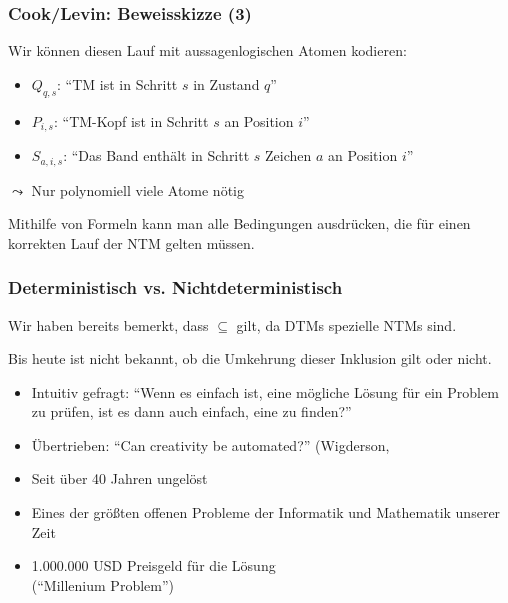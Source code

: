\documentclass[aspectratio=1610,onlymath]{beamer}
\begin{document}
\begin{frame}\frametitle{Cook/Levin: Beweisskizze (3)}

Wir können diesen Lauf mit aussagenlogischen Atomen kodieren:
\begin{itemize}
\item $Q_{q,s}$: "`TM ist in Schritt $s$ in Zustand $q$"'
% 
\item $P_{i,s}$: "`TM-Kopf ist in Schritt $s$ an Position $i$"'
\item $S_{a,i,s}$: "`Das Band enthält in Schritt $s$ Zeichen $a$ an Position $i$"'
\end{itemize}
$\leadsto$ Nur polynomiell viele Atome nötig
\bigskip

Mithilfe von Formeln kann man alle Bedingungen ausdrücken, die für einen korrekten Lauf der NTM gelten müssen.

\medskip



\end{frame}

\begin{frame}\frametitle{Deterministisch vs. Nichtdeterministisch}

	Wir haben bereits bemerkt, dass  ${}\subseteq{}$  gilt, da DTMs spezielle NTMs sind.
	\medskip

  \alert{Bis heute ist nicht bekannt, ob die Umkehrung dieser Inklusion gilt oder nicht.}
  \begin{itemize}
  \item Intuitiv gefragt: "`Wenn es einfach ist, eine mögliche Lösung für ein Problem zu prüfen, ist es dann auch einfach, eine zu finden?"'
  \item Übertrieben: "`Can creativity be automated?"' (Wigderson, 
  \item Seit über 40 Jahren ungelöst
  \item Eines der größten offenen Probleme der Informatik und Mathematik unserer Zeit
  \item 1.000.000 USD Preisgeld für die Lösung\\("`Millenium Problem"')
  \end{itemize}
   
\end{frame}
\end{document}
